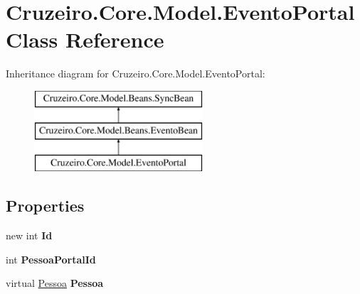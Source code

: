 \hypertarget{class_cruzeiro_1_1_core_1_1_model_1_1_evento_portal}{}\section{Cruzeiro.\+Core.\+Model.\+Evento\+Portal Class Reference}
\label{class_cruzeiro_1_1_core_1_1_model_1_1_evento_portal}
Inheritance diagram for Cruzeiro.\+Core.\+Model.\+Evento\+Portal\+:\begin{figure}[H]
\begin{center}
\leavevmode
\includegraphics[height=3.000000cm]{class_cruzeiro_1_1_core_1_1_model_1_1_evento_portal}
\end{center}
\end{figure}
\subsection*{Properties}
\begin{DoxyCompactItemize}
\item 
new int {\bfseries Id}\hypertarget{class_cruzeiro_1_1_core_1_1_model_1_1_evento_portal_a59ebb7430dd3a670c03765d87a7c07aa}{}\label{class_cruzeiro_1_1_core_1_1_model_1_1_evento_portal_a59ebb7430dd3a670c03765d87a7c07aa}

\item 
int {\bfseries Pessoa\+Portal\+Id}\hypertarget{class_cruzeiro_1_1_core_1_1_model_1_1_evento_portal_a84b9068971f82a6c9184335c43e7c29e}{}\label{class_cruzeiro_1_1_core_1_1_model_1_1_evento_portal_a84b9068971f82a6c9184335c43e7c29e}

\item 
virtual \hyperlink{class_cruzeiro_1_1_core_1_1_model_1_1_pessoa}{Pessoa} {\bfseries Pessoa}\hypertarget{class_cruzeiro_1_1_core_1_1_model_1_1_evento_portal_a3925e1b522eed62dafd3c233addf6553}{}\label{class_cruzeiro_1_1_core_1_1_model_1_1_evento_portal_a3925e1b522eed62dafd3c233addf6553}

\end{DoxyCompactItemize}

